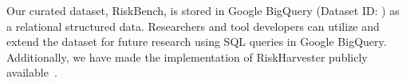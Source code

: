 Our curated dataset, RiskBench, is stored in Google BigQuery (Dataset ID: \textit{}) as a relational structured data. Researchers and tool developers can utilize and extend the dataset for future research using SQL queries in Google BigQuery. Additionally, we have made the implementation of RiskHarvester publicly available~\cite{riskartifacts}.

